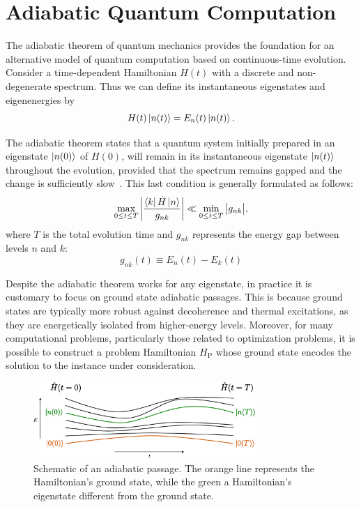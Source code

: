 \section{Adiabatic Quantum Computation}
\label{Section:AQC}
The adiabatic theorem of quantum mechanics provides the foundation for an alternative model
of quantum computation based on continuous-time evolution. Consider a time-dependent Hamiltonian
$H(t)$ with a discrete and non-degenerate spectrum. Thus we can define its instantaneous
eigenstates and eigenenergies by
\begin{equation}
    H(t) \ket{n(t)} = E_n (t) \ket{n(t)}.
    \label{eq:instantaneous_eigenstates}
\end{equation}

\noindent The adiabatic theorem states that a quantum system initially prepared in an eigenstate
$\ket{n(0)}$ of  $H(0)$, will remain in its instantaneous eigenstate $\ket{n(t)}$ throughout
the evolution, provided that the spectrum remains gapped and the change is sufficiently
slow~\cite{sarandy_consistency_2004,albash_adiabatic_2018}. This last condition is generally formulated as follows:
\begin{equation}
    \max_{0 \leq t \leq T} \bigg| \dfrac{\bra{k} \dot{H} \ket{n}}{g_{nk}} \bigg| \ll \min_{0 \leq t \leq T} \big| g_{nk} \big|,
    \label{eq:adiabatic_condition}
\end{equation}
where $T$ is the total evolution time and $g_{nk}$ represents the energy gap between levels $n$ and $k$: 
\begin{equation}
    g_{nk}(t) \equiv E_n(t) - E_k(t)
    \label{eq:energy_gap}
\end{equation}

Despite the adiabatic theorem works for any eigenstate, in practice it is customary to focus on
ground state adiabatic passages. This is because ground states are typically more robust against
decoherence and thermal excitations, as they are energetically isolated from higher-energy levels.
Moreover, for many computational problems, particularly those related to optimization problems,
it is possible to construct a problem Hamiltonian $H_\mathrm{P}$ whose ground state encodes
the solution to the instance under consideration.

\begin{figure}[h]
    \centering
    \includegraphics[width=0.75\textwidth]{01-introduction/figs/adiabatic_theorem.pdf}
    \caption{Schematic of an adiabatic passage. The orange line represents the Hamiltonian's ground state, while
    the green a Hamiltonian's eigenstate different from the ground state.}
    \label{fig:adiabatic_passage}
\end{figure}

